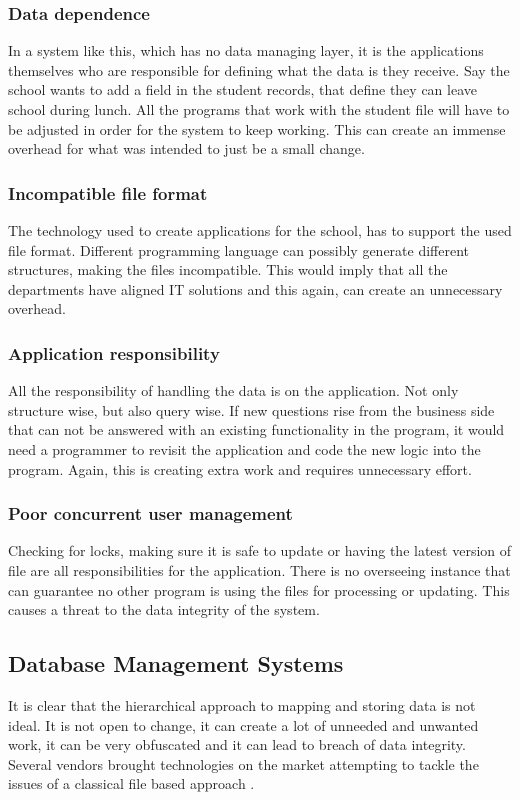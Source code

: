 \subsubsection{Data dependence}
In a system like this, which has no data managing layer, it is the applications themselves who are responsible for defining what the data is they receive. Say the school wants to add a field in the student records, that define they can leave school during lunch. All the programs that work with the student file will have to be adjusted in order for the system to keep working. This can create an immense overhead for what was intended to just be a small change.

\subsubsection{Incompatible file format}
The technology used to create applications for the school, has to support the used file format. Different programming language can possibly generate different structures, making the files incompatible. This would imply that all the departments have aligned IT solutions and this again, can create an unnecessary overhead.

\subsubsection{Application responsibility}
All the responsibility of handling the data is on the application. Not only structure wise, but also query wise. If new questions rise from the business side that can not be answered with an existing functionality in the program, it would need a programmer to revisit the application and code the new logic into the program. Again, this is creating extra work and requires unnecessary effort.

\subsubsection{Poor concurrent user management}
Checking for locks, making sure it is safe to update or having the latest version of file are all responsibilities for the application. There is no overseeing instance that can guarantee no other program is using the files for processing or updating. This causes a threat to the data integrity of the system. 

\subsection{Database Management Systems}
It is clear that the hierarchical approach to mapping and storing data is not ideal. It is not open to change, it can create a lot of unneeded and unwanted work, it can be very obfuscated and it can lead to breach of data integrity. Several vendors brought technologies on the market attempting to tackle the issues of a classical file based approach \autocite{dbhist2}.

